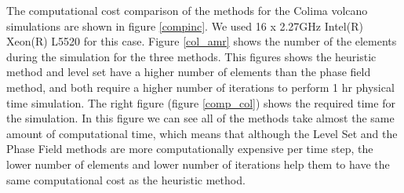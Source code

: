 \documentclass[letterpaper,10pt]{article}
\begin{document}
The computational cost comparison of the methods for the Colima volcano simulations are shown in figure \ref{compinc}. 
We used 16 x 2.27GHz Intel(R) Xeon(R) L5520 for this case. Figure \ref{col_amr} shows the number of the elements during the simulation for the three methods.  
This figures shows the heuristic method and level set have a higher number of elements than the phase field method, 
and both require a higher number of iterations to perform 1 hr physical time simulation. 
The right figure (figure \ref{comp_col}) shows the required time for the simulation. 
In this figure we can see all of the methods take almost the same amount of computational time, which means that although the 
Level Set and the Phase Field methods are more computationally expensive per time step, the lower number of elements and lower
number of iterations help them to have the same computational cost as the heuristic method.  
\end{document}
